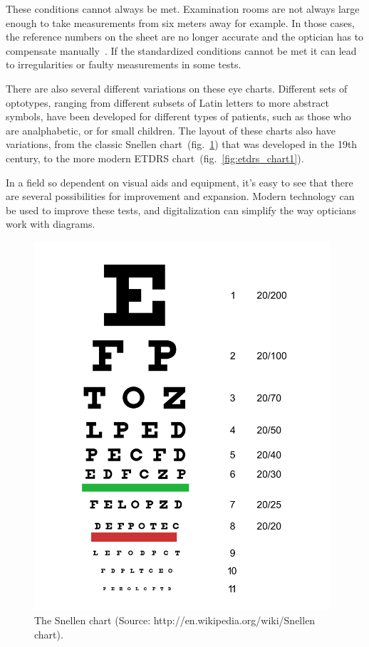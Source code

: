 \documentclass[12pt,a4paper,notitlepage]{report}
\begin{document}
These conditions cannot always be met. Examination rooms are not always large enough to take measurements from six meters away for example. In those cases, the reference numbers on the sheet are no longer accurate and the optician has to compensate manually~\cite{PGSoderberg}. If the standardized conditions cannot be met it can lead to irregularities or faulty measurements in some tests.

There are also several different variations on these eye charts. Different sets of optotypes, ranging from different subsets of Latin letters to more abstract symbols, have been developed for different types of patients, such as those who are analphabetic, or for small children. The layout of these charts also have variations, from the classic Snellen chart~(fig.~\ref{fig:snellen_chart1}) that was developed in the 19th century, to the more modern ETDRS chart~(fig.~\ref{fig:etdrs_chart1}).


In a field so dependent on visual aids and equipment, it's easy to see that there are several possibilities for improvement and expansion. Modern technology can be used to improve these tests, and digitalization can simplify the way opticians work with diagrams.

\begin{figure}[ht!]
\centering
\includegraphics[width=110mm]{images/Snellen_chart.png}
\caption{The Snellen chart (Source: http://en.wikipedia.org/wiki/Snellen chart\cite{img_snellen}).} \label{fig:snellen_chart1}
\end{figure} 
\end{document}
